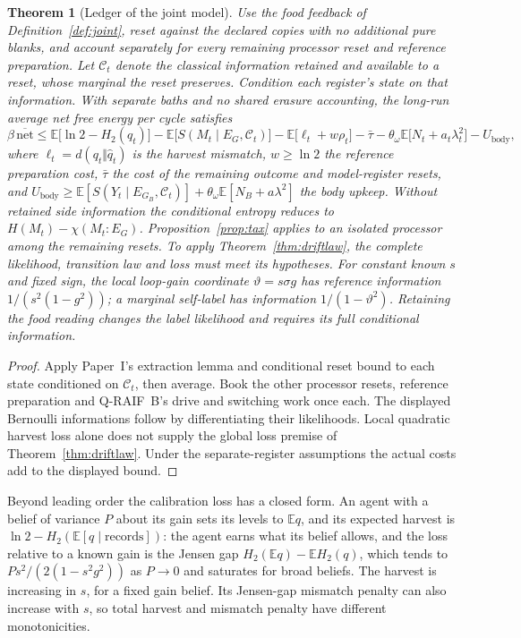 \documentclass[12pt]{article}
\newtheorem{theorem}{Theorem}
\theoremstyle{definition}
\newcommand{\E}{\mathbb E}
\begin{document}
\begin{theorem}[Ledger of the joint model]
\label{thm:ledger}
Use the food feedback of Definition~\ref{def:joint}, reset against the declared copies with no additional pure blanks, and account separately for every remaining processor reset and reference preparation. Let $\mathcal C_t$ denote the classical information retained and available to a reset, whose marginal the reset preserves. Condition each register's state on that information. With separate baths and no shared erasure accounting, the long-run average net free energy per cycle satisfies
\begin{equation}
\label{eq:ledger}
\beta\,\overline{\mathrm{net}}\le\E\bigl[\ln2-H_2(q_t)\bigr]-\E\bigl[S(M_t\mid E_G,\mathcal C_t)\bigr]-\E\bigl[\ell_t+w\rho_t\bigr]-\bar\tau-\theta_\omega\E\bigl[N_t+a_t\lambda_t^2\bigr]-U_{\mathrm{body}},
\end{equation}
where $\ell_t=d(q_t\Vert\hat q_t)$ is the harvest mismatch, $w\ge\ln2$ the reference preparation cost, $\bar\tau$ the cost of the remaining outcome and model-register resets, and $U_{\mathrm{body}}\ge\E[S(Y_t\mid E_{G_B},\mathcal C_t)]+\theta_\omega\E[N_B+a\lambda^2]$ the body upkeep. Without retained side information the conditional entropy reduces to $H(M_t)-\chi(M_t{:}E_G)$. Proposition~\ref{prop:tax} applies to an isolated processor among the remaining resets. To apply Theorem~\ref{thm:driftlaw}, the complete likelihood, transition law and loss must meet its hypotheses. For constant known $s$ and fixed sign, the local loop-gain coordinate $\vartheta=s\sigma g$ has reference information $1/(s^2(1-g^2))$; a marginal self-label has information $1/(1-\vartheta^2)$. Retaining the food reading changes the label likelihood and requires its full conditional information.
\end{theorem}

\begin{proof}
Apply Paper~I's extraction lemma and conditional reset bound to each state conditioned on $\mathcal C_t$, then average. Book the other processor resets, reference preparation and Q-RAIF~B's drive and switching work once each. The displayed Bernoulli informations follow by differentiating their likelihoods. Local quadratic harvest loss alone does not supply the global loss premise of Theorem~\ref{thm:driftlaw}. Under the separate-register assumptions the actual costs add to the displayed bound.
\end{proof}

Beyond leading order the calibration loss has a closed form. An agent with a belief of variance $P$ about its gain sets its levels to $\E q$, and its expected harvest is $\ln2-H_2(\E[q\mid\text{records}])$: the agent earns what its belief allows, and the loss relative to a known gain is the Jensen gap $H_2(\E q)-\E H_2(q)$, which tends to $Ps^2/(2(1-s^2g^2))$ as $P\to0$ and saturates for broad beliefs. The harvest is increasing in $s$, for a fixed gain belief. Its Jensen-gap mismatch penalty can also increase with $s$, so total harvest and mismatch penalty have different monotonicities.
\end{document}
